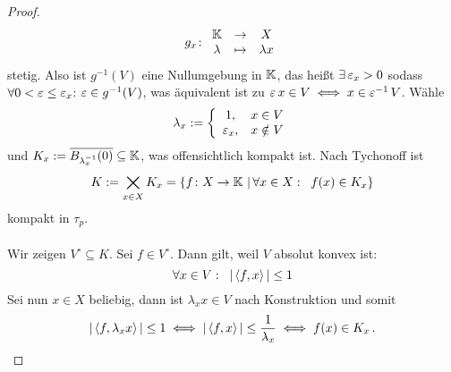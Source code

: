 \documentclass{article}
\begin{document}
\begin{proof}
		\[g_x\colon \begin{array}{clc}
			\operatorname{\mathbb K}&\to&X\\
			\lambda&\mapsto&\lambda x
		\end{array}\]
		stetig. Also ist $g^{-1}(V)$ eine Nullumgebung in $\operatorname{\mathbb K}$, das heißt $\exists \operatorname{\varepsilon}_x>0$ sodass $\forall 0<\operatorname{\varepsilon}\le\operatorname{\varepsilon}_x$: $\operatorname{\varepsilon}\in g^{-1}(V)$, was äquivalent ist zu $\operatorname{\varepsilon} x\in V\iff x\in \operatorname{\varepsilon}^{-1} V$. Wähle
		\[\lambda_x:=\left\{\begin{array}{cl}
			1,&x\in V\\
			\operatorname{\varepsilon}_x,& x\notin V
			\end{array}
			\right.\]
		und $K_x:=\overline{B_{\lambda_x^{-1}}(0)}\subseteq \operatorname{\mathbb K}$, was offensichtlich kompakt ist. Nach Tychonoff ist
		\[K:=\bigtimes_{x\in X}K_x=\{f\colon X\to \operatorname{\mathbb K}\,|\,\forall x\in X:\;\;f(x)\in K_x\}\]
		kompakt in $\tau_p$.\\
		\\
		Wir zeigen $V^{\circ}\subseteq K$. Sei $f\in V^{\circ}$. Dann gilt, weil $V$ absolut konvex ist:
		\[\forall x\in V:\;\;|\left\langle f,x\right\rangle|\le 1\]
		Sei nun $x\in X$ beliebig, dann ist $\lambda_xx\in V$ nach Konstruktion und somit
		\[|\left\langle f,\lambda_xx\right\rangle|\le 1\iff |\left\langle f,x\right\rangle|\le \frac{1}{\lambda_x}\iff f(x)\in K_x\,.\]
		

\end{proof}
\end{document}
